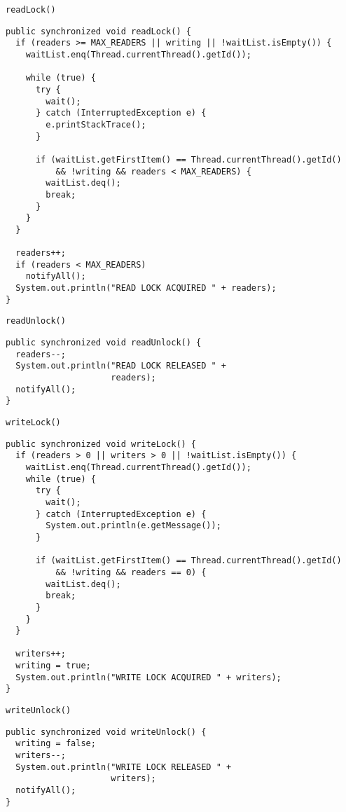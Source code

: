 \begin{frame}[fragile]{\lstinline!readLock()!}
\begin{lstlisting}[basicstyle=\fontsize{7}{9}\selectfont\ttfamily]
public synchronized void readLock() {
  if (readers >= MAX_READERS || writing || !waitList.isEmpty()) {
    waitList.enq(Thread.currentThread().getId());

    while (true) {
      try {
        wait();
      } catch (InterruptedException e) {
        e.printStackTrace();
      }

      if (waitList.getFirstItem() == Thread.currentThread().getId()
          && !writing && readers < MAX_READERS) {
        waitList.deq();
        break;
      }
    }
  }

  readers++;
  if (readers < MAX_READERS)
    notifyAll();
  System.out.println("READ LOCK ACQUIRED " + readers);
}
\end{lstlisting}
\end{frame}

\begin{frame}[fragile]{\lstinline!readUnlock()!}
\begin{lstlisting}
public synchronized void readUnlock() {
  readers--;
  System.out.println("READ LOCK RELEASED " + 
                     readers);
  notifyAll();
}
\end{lstlisting}
\end{frame}

\begin{frame}[fragile]{\lstinline!writeLock()!}
\begin{lstlisting}[basicstyle=\fontsize{7}{9}\selectfont\ttfamily]
public synchronized void writeLock() {
  if (readers > 0 || writers > 0 || !waitList.isEmpty()) {
    waitList.enq(Thread.currentThread().getId());
    while (true) {
      try {
        wait();
      } catch (InterruptedException e) {
        System.out.println(e.getMessage());
      }

      if (waitList.getFirstItem() == Thread.currentThread().getId()
          && !writing && readers == 0) {
        waitList.deq();
        break;
      }
    }
  }
  
  writers++;
  writing = true;
  System.out.println("WRITE LOCK ACQUIRED " + writers);
}
\end{lstlisting}
\end{frame}

\begin{frame}[fragile]{\lstinline!writeUnlock()!}
\begin{lstlisting}
public synchronized void writeUnlock() {
  writing = false;
  writers--;    
  System.out.println("WRITE LOCK RELEASED " + 
                     writers);
  notifyAll();
}
\end{lstlisting}
\end{frame}



